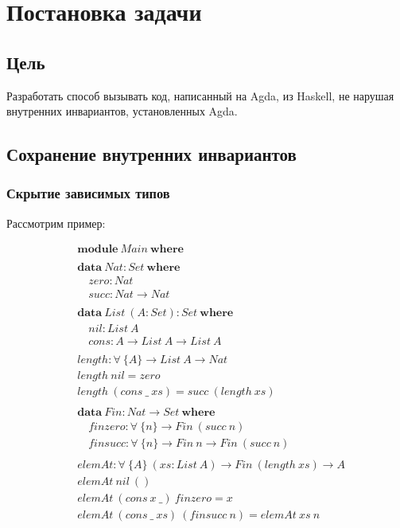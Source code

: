 \section{Постановка задачи}

\subsection{Цель}\label{sec:task-goal}

Разработать способ вызывать код, написанный на Agda, из Haskell, не нарушая
внутренних инвариантов, установленных Agda.

\subsection{Сохранение внутренних инвариантов}

\subsubsection{Скрытие зависимых типов}

Рассмотрим пример:

\label{text:task-agda-code}
\begin{align*}
&\mathbf{module}\ Main\ \mathbf{where}\\
\\
&\mathbf{data}\ Nat : Set\ \mathbf{where}\\
&\quad zero : Nat\\
&\quad succ : Nat \rightarrow Nat\\
\\
&\mathbf{data}\ List\ (A : Set) : Set\ \mathbf{where}\\
&\quad nil : List\ A\\
&\quad cons : A \rightarrow List\ A \rightarrow List\ A\\
\\
&length : \forall\ \{A\} \rightarrow List\ A \rightarrow Nat\\
&length\ nil = zero\\
&length\ (cons\ \_\ xs) = succ\ (length\ xs)\\
\\
&\mathbf{data}\ Fin : Nat \rightarrow Set\ \mathbf{where}\\
&\quad finzero : \forall\ \{n\} \rightarrow Fin\ (succ\ n)\\
&\quad finsucc : \forall\ \{n\} \rightarrow Fin\ n \rightarrow Fin\ (succ\ n)\\
\\
&elemAt : \forall\ \{A\}\ (xs : List\ A) \rightarrow Fin\ (length\ xs) \rightarrow A\\
&elemAt\ nil\ ()\\
&elemAt\ (cons\ x\ \_)\ finzero = x\\
&elemAt\ (cons\ \_\ xs)\ (finsucc\ n) = elemAt\ xs\ n
\end{align*}

